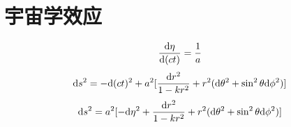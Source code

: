 \chapter{宇宙学效应}

\begin{equation}
    \frac{\mathrm{d}\eta}{\mathrm{d}(ct)}=\frac{1}{a}
\end{equation}
\begin{equation}
    \mathrm{d} s^2=-\mathrm{d}(ct)^2+a^2[\frac{\mathrm{d} r^2}{1-kr^2}+r^2(\mathrm{d}\theta^2+\sin^2\theta\mathrm{d}\phi^2)]
\end{equation}
\begin{equation}
    \mathrm{d} s^2=a^2[-\mathrm{d}\eta^2+\frac{\mathrm{d} r^2}{1-kr^2}+r^2(\mathrm{d}\theta^2+\sin^2\theta\mathrm{d}\phi^2)]
\end{equation}
